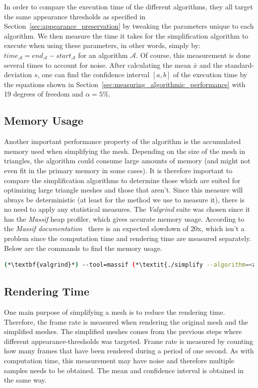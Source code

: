 In order to compare the execution time of the different algorithms, they all target the same appearance thresholds as specified in Section~\ref{sec:appearance_preservation} by tweaking the parameters unique to each algorithm. We then measure the time it takes for the simplification algorithm to execute when using these parameters, in other words, simply by: \(time_\mathcal{A} = end_\mathcal{A} - start_\mathcal{A}\) for an algorithm \(\mathcal{A}\). Of course, this measurement is done several times to account for noise. After calculating the mean \(\bar{x}\) and the standard-deviation \(s\), one can find the confidence interval \([a, b]\) of the execution time by the equations shown in Section~\ref{sec:measuring_algorithmic_performance} with 19 degrees of freedom and \(\alpha = 5 \%\).

\subsection{Memory Usage} \label{sec:memory_usage}

Another important performance property of the algorithm is the accumulated memory used when simplifying the mesh. Depending on the size of the mesh in triangles, the algorithm could consume large amounts of memory (and might not even fit in the primary memory in some cases). It is therefore important to compare the simplification algorithms to determine those which are suited for optimizing large triangle meshes and those that aren't. Since this measure will always be deterministic (at least for the method we use to measure it), there is no need to apply any statistical measures. The \emph{Valgrind} suite was chosen since it has the \emph{Massif} heap profiler, which gives accurate memory usage. According to the \emph{Massif documentation}~\cite{valgrind2017manual} there is an expected slowdown of 20x, which isn't a problem since the computation time and rendering time are measured separately. Below are the commands to find the memory usage.

\begin{lstlisting}[language=bash]
  (*\textbf{valgrind}*) --tool=massif (*\textit{./simplify --algorithm=<algorithm> <input-mesh> <output-mesh>}*)
\end{lstlisting}

\subsection{Rendering Time} \label{sec:rendering_time}
One main purpose of simplifying a mesh is to reduce the rendering time. Therefore, the frame rate is measured when rendering the original mesh and the simplified meshes. The simplified meshes comes from the previous steps where different appearance-thresholds was targeted. Frame rate is measured by counting how many frames that have been rendered during a period of one second. As with computation time, this measurement may have noise and therefore multiple samples needs to be obtained. The mean and confidence interval is obtained in the same way.
\fi


